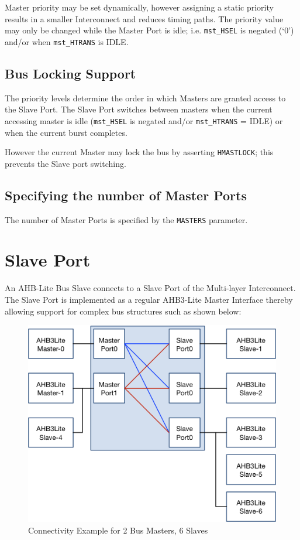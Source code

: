 Master priority may be set dynamically, however assigning a static
priority results in a smaller Interconnect and reduces timing paths. The
priority value may only be changed while the Master Port is idle; i.e.
\texttt{mst\_HSEL} is negated (`0') and/or when \texttt{mst\_HTRANS} is IDLE.

\subsection{Bus Locking Support}\label{bus-locking-support}

The priority levels determine the order in which Masters are granted
access to the Slave Port. The Slave Port switches between masters when
the current accessing master is idle (\texttt{mst\_HSEL} is negated and/or
\texttt{mst\_HTRANS} = IDLE) or when the current burst completes.

However the current Master may lock the bus by asserting \texttt{HMASTLOCK}; this
prevents the Slave port switching.

\subsection{Specifying the number of Master
Ports}\label{specifying-the-number-of-master-ports}

The number of Master Ports is specified by the \texttt{MASTERS} parameter.

\section{Slave Port}\label{slave-port}

An AHB-Lite Bus Slave connects to a Slave Port of the Multi-layer
Interconnect. The Slave Port is implemented as a regular AHB3-Lite Master
Interface thereby allowing support for complex bus structures such as
shown below:

\begin{figure}[tbh]
\includegraphics{assets/img/ahb-lite-switch-sys3}
\caption{Connectivity Example	for 2 Bus Masters, 6 Slaves}
\label{fig:ahb-lite-switch-sys3}
\end{figure}

